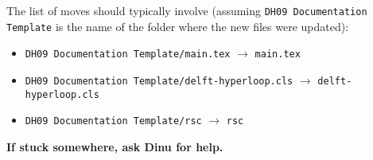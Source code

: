 The list of moves should typically involve (assuming \verb|DH09 Documentation Template| is the name of the folder where the new files were updated):

\begin{itemize}
    \item \verb|DH09 Documentation Template/main.tex| $\to$ \verb|main.tex|
    \item \verb|DH09 Documentation Template/delft-hyperloop.cls| $\to$ \verb|delft-hyperloop.cls|
    \item \verb|DH09 Documentation Template/rsc| $\to$ \verb|rsc|
\end{itemize}

\textbf{If stuck somewhere, ask Dinu for help.}